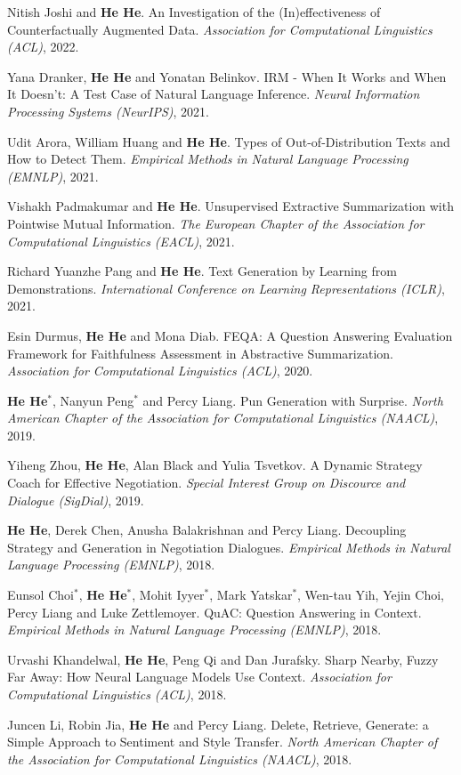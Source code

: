 Nitish Joshi and \textbf{He He}. An Investigation of the (In)effectiveness of Counterfactually Augmented Data. \textit{Association for Computational Linguistics (ACL)}, 2022.

Yana Dranker, \textbf{He He} and Yonatan Belinkov. {IRM} - When It Works and When It Doesn't: A Test Case of Natural Language Inference. \textit{Neural Information Processing Systems (NeurIPS)}, 2021.

Udit Arora, William Huang and \textbf{He He}. Types of Out-of-Distribution Texts and How to Detect Them. \textit{Empirical Methods in Natural Language Processing (EMNLP)}, 2021.

Vishakh Padmakumar and \textbf{He He}. Unsupervised Extractive Summarization with Pointwise Mutual Information. \textit{The European Chapter of the Association for Computational Linguistics (EACL)}, 2021.

Richard Yuanzhe Pang and \textbf{He He}. Text Generation by Learning from Demonstrations. \textit{International Conference on Learning Representations (ICLR)}, 2021.

Esin Durmus, \textbf{He He} and Mona Diab. FEQA: A Question Answering Evaluation Framework for Faithfulness Assessment in Abstractive Summarization. \textit{Association for Computational Linguistics (ACL)}, 2020.

\textbf{He He}$^*$, Nanyun Peng$^*$ and Percy Liang. Pun Generation with Surprise. \textit{North American Chapter of the Association for Computational Linguistics (NAACL)}, 2019.

Yiheng Zhou, \textbf{He He}, Alan Black and Yulia Tsvetkov. A Dynamic Strategy Coach for Effective Negotiation. \textit{Special Interest Group on Discource and Dialogue (SigDial)}, 2019.

\textbf{He He}, Derek Chen, Anusha Balakrishnan and Percy Liang. Decoupling Strategy and Generation in Negotiation Dialogues. \textit{Empirical Methods in Natural Language Processing (EMNLP)}, 2018.

Eunsol Choi$^*$, \textbf{He He}$^*$, Mohit Iyyer$^*$, Mark Yatskar$^*$, Wen-tau Yih, Yejin Choi, Percy Liang and Luke Zettlemoyer. QuAC: Question Answering in Context. \textit{Empirical Methods in Natural Language Processing (EMNLP)}, 2018.

Urvashi Khandelwal, \textbf{He He}, Peng Qi and Dan Jurafsky. Sharp Nearby, Fuzzy Far Away: How Neural Language Models Use Context. \textit{Association for Computational Linguistics (ACL)}, 2018.

Juncen Li, Robin Jia, \textbf{He He} and Percy Liang. Delete, Retrieve, Generate: a Simple Approach to Sentiment and Style Transfer. \textit{North American Chapter of the Association for Computational Linguistics (NAACL)}, 2018.


